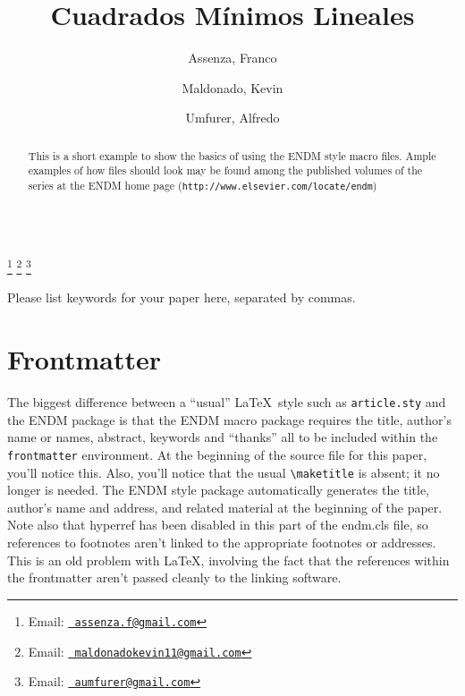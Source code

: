 \documentclass{endm}
\begin{document}
\begin{verbatim}\end{verbatim}\vspace{2.5cm}

\begin{frontmatter}

\title{Cuadrados M\'inimos Lineales}

\author{Assenza, Franco}
\address{LU: 921/12}

\author{Maldonado, Kevin}
\address{LU: 018/14}

\author{Umfurer, Alfredo}
\address{LU: 538/12}

\thanks[faemail]{Email:
\href{mailto:assenza.f@gmail.com} {\texttt{\normalshape
assenza.f@gmail.com}}}
\thanks[kmemail]{Email:
\href{mailto:maldonadokevin11@gmail.com} {\texttt{\normalshape
maldonadokevin11@gmail.com}}}
\thanks[auemail]{Email:
\href{mailto:aumfurer@gmail.com} {\texttt{\normalshape
aumfurer@gmail.com}}}

\begin{abstract}
This is a short example to show the basics of using the ENDM style
macro files. Ample examples of how files should look may be found
among the published volumes of the series at the ENDM home page
({\texttt{http://www.elsevier.com/locate/endm}})
\end{abstract}

\begin{keyword}
Please list keywords for your paper here, separated by commas.
\end{keyword}

\end{frontmatter}




\section{Frontmatter}

The biggest difference between a ``usual'' \LaTeX\ style such as
\texttt{article.sty} and the ENDM package is that the ENDM macro
package requires the title, author's name or names, abstract, keywords
and ``thanks'' all to be included within the \texttt{frontmatter}
environment. At the beginning of the source file for this paper, you'll
notice this. Also, you'll notice that the usual \verb+\maketitle+ is
absent; it no longer is needed. The ENDM style package automatically
generates the title, author's name and address, and related material at
the beginning of the paper. Note also that hyperref has been disabled in
this part of the endm.cls file, so references to footnotes aren't linked
to the appropriate footnotes or addresses. This is an old problem with
\LaTeX, involving the fact that the references within the frontmatter
aren't passed cleanly to the linking software.
\end{document}
